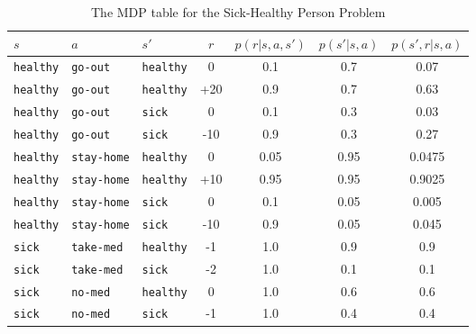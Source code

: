 \documentclass[11pt]{article}
\begin{document}
    \begin{table}[ht]
        \centering
        \renewcommand{\arraystretch}{1.25}
        \begin{tabular}{lllc|c|c|c}
            $s$ & $a$ & $s'$ & $r$ & $p(r | s, a, s')$ & $p(s' | s, a)$ & $p(s', r | s, a)$ \\
            \hline
            \texttt{healthy} & \texttt{go-out} & \texttt{healthy} & 0 & 0.1 & 0.7 & 0.07 \\
            \texttt{healthy} & \texttt{go-out} & \texttt{healthy} & +20 & 0.9 & 0.7 & 0.63 \\
            \texttt{healthy} & \texttt{go-out} & \texttt{sick} & 0 & 0.1 & 0.3 & 0.03 \\
            \texttt{healthy} & \texttt{go-out} & \texttt{sick} & -10 & 0.9 & 0.3 & 0.27 \\
            \texttt{healthy} & \texttt{stay-home} & \texttt{healthy} & 0 & 0.05 & 0.95 & 0.0475 \\
            \texttt{healthy} & \texttt{stay-home} & \texttt{healthy} & +10 & 0.95 & 0.95 & 0.9025 \\
            \texttt{healthy} & \texttt{stay-home} & \texttt{sick} & 0 & 0.1 & 0.05 & 0.005 \\
            \texttt{healthy} & \texttt{stay-home} & \texttt{sick} & -10 & 0.9 & 0.05 & 0.045 \\
            \texttt{sick} & \texttt{take-med} & \texttt{healthy} & -1 & 1.0 & 0.9 & 0.9 \\
            \texttt{sick} & \texttt{take-med} & \texttt{sick} & -2 & 1.0 & 0.1 & 0.1 \\
            \texttt{sick} & \texttt{no-med} & \texttt{healthy} & 0 & 1.0 & 0.6 & 0.6 \\
            \texttt{sick} & \texttt{no-med} & \texttt{sick} & -1 & 1.0 & 0.4 & 0.4 \\
        \end{tabular}
        \caption{The MDP table for the Sick-Healthy Person Problem}
        \label{tab:mdp-sick-healthy}
    \end{table}
\end{document}
